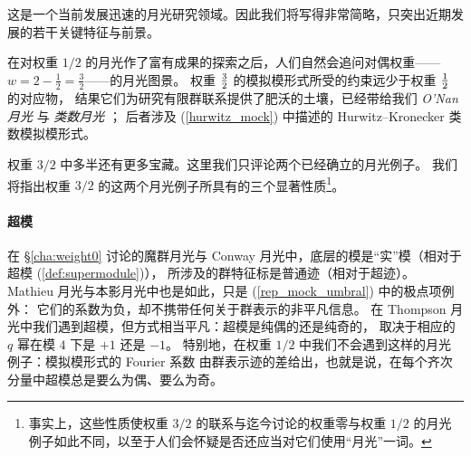 \documentclass[11pt,a4paper,fontset=windows]{ctexart}
\numberwithin{equation}{section}
\newcommand{\PSL}{\operatorname{\textsl{PSL}}}    %
\newcommand{\myparagraph}[1]{\paragraph{#1}\mbox\\}
\newcommand{\ZZ}{\mathbb{Z}}
\newcommand{\eq}[1]{(\ref{#1})}
\begin{document}
这是一个当前发展迅速的月光研究领域。因此我们将写得非常简略，只突出近期发展的若干关键特征与前景。


在对权重 $1/2$ 的月光作了富有成果的探索之后，人们自然会追问对偶权重——
$w=2-\frac{1}{2}=\frac{3}{2}$——的月光图景。
权重 $3\over 2$ 的模拟模形式所受的约束远少于权重 $1\over 2$ 的对应物，
结果它们为研究有限群联系提供了肥沃的土壤，已经带给我们
\emph{O'Nan 月光} \cite{onan} 与 \emph{类数月光} \cite{class_nr_moonshine}；
后者涉及 \eq{hurwitz_mock} 中描述的 Hurwitz–Kronecker 类数模拟模形式。


权重 $3/2$ 中多半还有更多宝藏。这里我们只评论两个已经确立的月光例子。
我们将指出权重 $3/2$ 的这两个月光例子所具有的三个显著性质\footnote{事实上，这些性质使权重 $3/2$ 的联系与迄今讨论的权重零与权重 $1/2$ 的月光例子如此不同，以至于人们会怀疑是否还应当对它们使用“月光”一词。}。


\myparagraph{超模}

在 \S\ref{cha:weight0} 讨论的魔群月光与 Conway 月光中，底层的模是“实”模（相对于超模 \eq{def:supermodule}），
所涉及的群特征标是普通迹（相对于超迹）。
Mathieu 月光与本影月光中也是如此，只是 \eq{rep_mock_umbral} 中的极点项例外：
它们的系数为负，却不携带任何关于群表示的非平凡信息。
在 Thompson 月光中我们遇到超模，但方式相当平凡：超模是纯偶的还是纯奇的，
取决于相应的 $q$ 幂在模 $4$ 下是 $+1$ 还是 $-1$。
特别地，在权重 $1/2$ 中我们不会遇到这样的月光例子：模拟模形式的 Fourier 系数
由群表示迹的差给出，也就是说，在每个齐次分量中超模总是要么为偶、要么为奇。

\end{document}
